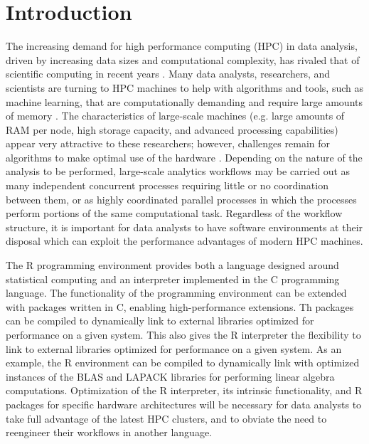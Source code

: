 \graphicspath{{plots/}}
\section{Introduction}

The increasing demand for high performance computing (HPC) in data analysis, driven by
increasing data sizes and computational complexity, has rivaled that of scientific
computing in recent years \cite{fox:bdBenchmarking, kouzes:paradigm}. Many data analysts,
researchers, and scientists are turning to HPC machines to help with algorithms and tools,
such as machine learning, that are computationally demanding and require large amounts of
memory \cite{raj:hpcBigData}. The characteristics of large-scale machines (e.g. large
amounts of RAM per node, high storage capacity, and advanced processing capabilities)
appear very attractive to these researchers; however, challenges remain for algorithms to
make optimal use of the hardware \cite{lee:model}. Depending on the nature of the analysis
to be performed, large-scale analytics workflows may be carried out as many independent
concurrent processes requiring little or no coordination between them, or as highly coordinated
parallel processes in which the processes perform portions of the same computational task.
Regardless of the workflow structure, it is important for data analysts to have software
environments at their disposal which can exploit the performance advantages of modern HPC
machines.

The R programming environment provides both a language designed around statistical
   computing and an interpreter implemented in the C programming language.
The functionality of the programming environment can be extended with packages written in C,
   enabling high-performance extensions.
Th packages can be compiled to dynamically link to external libraries optimized for
   performance on a given system.
This also gives the R interpreter the flexibility to link to external libraries optimized for
performance on a given system. As an example, the R environment can be compiled to
dynamically link with optimized instances of the BLAS \cite{dongarra:1990blas} and LAPACK
\cite{hammarling:1988blas} libraries for performing linear algebra computations.
Optimization of the R interpreter, its intrinsic functionality, and R packages for
specific hardware architectures will be necessary for data analysts to take full advantage
of the latest HPC clusters, and to obviate the need to reengineer their workflows
in another language.

